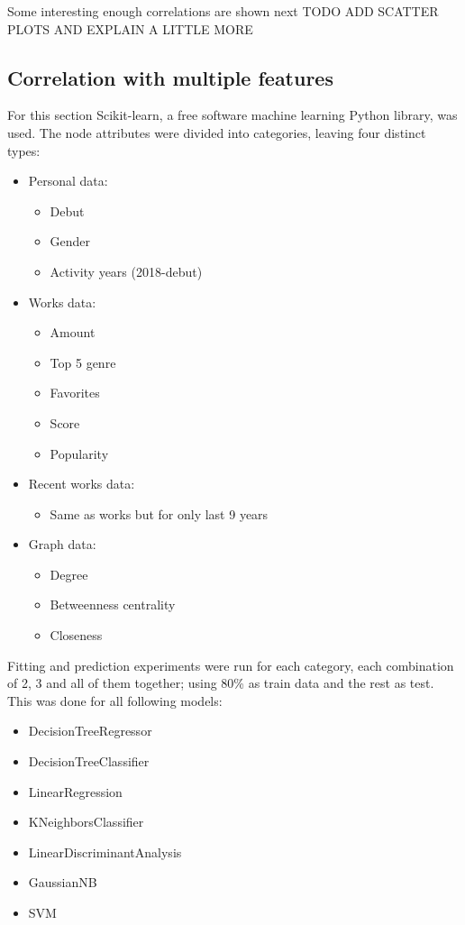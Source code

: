 Some interesting enough correlations are shown next
TODO ADD SCATTER PLOTS AND EXPLAIN A LITTLE MORE

\subsection{Correlation with multiple features}
For this section Scikit-learn, a free software machine learning Python library, was used. The node attributes were divided into categories, leaving four distinct types:

\begin{itemize}
	\item Personal data:
	\begin{itemize}
		\item Debut
		\item Gender
		\item Activity years (2018-debut)
	\end{itemize}
	\item Works data:
	\begin{itemize}
		\item Amount
		\item Top 5 genre
		\item Favorites
		\item Score
		\item Popularity
	\end{itemize}
	\item Recent works data:
	\begin{itemize}
		\item Same as works but for only last 9 years
	\end{itemize}	
	\item Graph data:
	\begin{itemize}
		\item Degree
		\item Betweenness centrality
		\item Closeness
	\end{itemize}
\end{itemize}

Fitting and prediction experiments were run for each category, each combination of 2, 3 and all of them together; using 80\% as train data and the rest as test. This was done for all following models:
\begin{itemize}
	\item DecisionTreeRegressor
	\item DecisionTreeClassifier
	\item LinearRegression
	\item KNeighborsClassifier
	\item LinearDiscriminantAnalysis
	\item GaussianNB
	\item SVM
\end{itemize}

